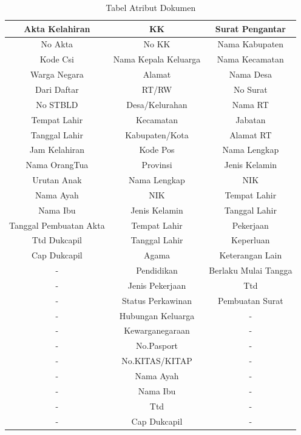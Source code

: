 \begin{table}
\caption{Tabel Atribut Dokumen}
\centering
\begin{tabular}{|c|c|c|}
\hline
\textbf{Akta Kelahiran}&\textbf{KK}&\textbf{Surat Pengantar}\\
\hline
No Akta&No KK&Nama Kabupaten\\
\hline
Kode Csi&Nama Kepala Keluarga&Nama Kecamatan\\
\hline
Warga Negara&Alamat&Nama Desa\\
\hline
Dari Daftar&RT/RW&No Surat\\
\hline
No STBLD&Desa/Kelurahan&Nama RT\\
\hline
Tempat Lahir&Kecamatan&Jabatan\\
\hline
Tanggal Lahir&Kabupaten/Kota&Alamat RT\\
\hline
Jam Kelahiran&Kode Pos&Nama Lengkap\\
\hline
Nama OrangTua&Provinsi&Jenis Kelamin\\
\hline
Urutan Anak&Nama Lengkap&NIK\\
\hline
Nama Ayah&NIK&Tempat Lahir\\
\hline
Nama Ibu&Jenis Kelamin&Tanggal Lahir\\
\hline
Tanggal Pembuatan Akta&Tempat Lahir&Pekerjaan\\
\hline
Ttd Dukcapil&Tanggal Lahir&Keperluan\\
\hline
Cap Dukcapil&Agama&Keterangan Lain\\
\hline
-&Pendidikan&Berlaku Mulai Tangga\\
\hline
-&Jenis Pekerjaan&Ttd\\
\hline
-&Status Perkawinan&Pembuatan Surat\\
\hline
-&Hubungan Keluarga&-\\
\hline
-&Kewarganegaraan&-\\
\hline
-&No.Pasport&-\\
\hline
-&No.KITAS/KITAP&-\\
\hline
-&Nama Ayah&-\\
\hline
-&Nama Ibu&-\\
\hline
-&Ttd&-\\
\hline
-&Cap Dukcapil&-\\
\hline
\end{tabular}
\end{table}

